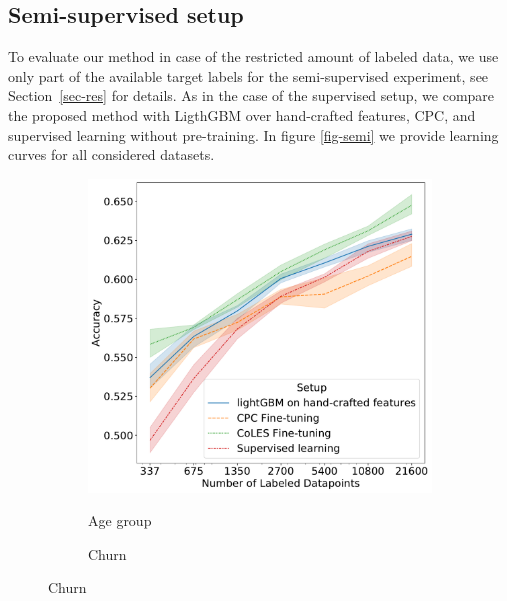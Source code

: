 \documentclass{article}
\begin{document}
\subsection{Semi-supervised setup} \label{app-sec-semi}

To evaluate our method in case of the restricted amount of labeled data, we use only part of the available target labels for the semi-supervised experiment, see Section~\ref{sec-res} for details. As in the case of the supervised setup, we compare the proposed method with LigthGBM over hand-crafted features, CPC, and supervised learning without pre-training. In figure \ref{fig-semi} we provide learning curves for all considered datasets.

\begin{figure}
  \centering
  \begin{subfigure}{0.5\linewidth}
    \caption{Age group}
    \includegraphics[width=\linewidth]{figures/ss_age_pred.pdf}
    \label{fig-semi-age2}
  \end{subfigure}%
  \begin{subfigure}{0.5\linewidth}
    \caption{Churn}

\end{subfigure}
\end{figure}
\end{document}
